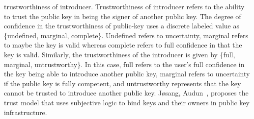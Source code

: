 trustworthiness of introducer. Trustworthiness of introducer refers to the
ability to trust the public key in being the signer of another public key. The
degree of confidence in the trustworthiness of public-key uses a discrete
labeled value as \{undefined, marginal, complete\}. Undefined refers to
uncertainty, marginal refers to maybe the key is valid whereas complete refers
to full confidence in that the key is valid. Similarly, the trustworthiness of
the introducer is given by \{full, marginal, untrustworthy\}. In this case, full
refers to the user's full confidence in the key being able to introduce another
public key, marginal refers to uncertainty if the public key is fully
competent, and untrustworthy represents that the key cannot be trusted to
introduce another public key.  Jøsang, Audun~\cite{josang1999algebra}, proposes
the trust model that uses subjective logic to bind keys and their owners in
public key infrastructure. 





%



